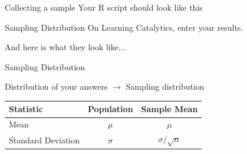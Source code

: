 \documentclass{beamer}\usepackage[]{graphicx}\usepackage[]{color}
\begin{document}
\begin{darkframes}
{\begin{lstlisting}[language=R,tabsize=2]
    \end{lstlisting}}	
    
    \begin{frame}[label=lists]{Collecting a sample}
    Your R script should look like this
    \sampleZillow
    
    \end{frame}


    \begin{frame}[label=lists]{Sampling Distribution} 
		On Learning Catalytics, enter your results. \newline
		
		And here is what they look like... %
    \end{frame}



    \begin{frame}[label=lists]{Sampling Distribution}
    	
		Distribution of your answers  $\rightarrow$ \alert{Sampling distribution} \newline 
		    	
    
    	
		\begin{table}[!b]
        {\carlitoTLF %
        \begin{tabularx}{\textwidth}{Xcc}
          \textbf{Statistic} & \textbf{Population} & \textbf{Sample Mean} \\
          \toprule
          Mean       		& $\mu$  & $\mu$  \\
          Standard Deviation          & $\sigma$     & $\sigma/\sqrt{n}$ \\
          \bottomrule
        \end{tabularx}}
        
      \end{table}    	
      \quad \newline
    	

\end{frame}
\end{darkframes}
\end{document}
